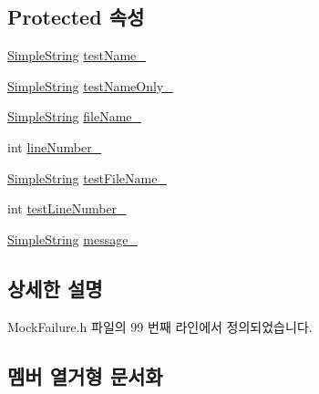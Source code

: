 \subsection*{Protected 속성}
\begin{DoxyCompactItemize}
\item 
\hyperlink{class_simple_string}{Simple\+String} \hyperlink{class_test_failure_afb42d7601608c3597c5279ddaf87e9d6}{test\+Name\+\_\+}
\item 
\hyperlink{class_simple_string}{Simple\+String} \hyperlink{class_test_failure_a60a0b2466b44483497e83d73b70241f2}{test\+Name\+Only\+\_\+}
\item 
\hyperlink{class_simple_string}{Simple\+String} \hyperlink{class_test_failure_a58b6159b0aa3b9775be67920baef742c}{file\+Name\+\_\+}
\item 
int \hyperlink{class_test_failure_ab83f5a7389dae9b8045aa6fbf55b153a}{line\+Number\+\_\+}
\item 
\hyperlink{class_simple_string}{Simple\+String} \hyperlink{class_test_failure_a19c231b59846532ec9d7ac8725886d67}{test\+File\+Name\+\_\+}
\item 
int \hyperlink{class_test_failure_abb1f7af8e12fc84b16898aa5b410ba2a}{test\+Line\+Number\+\_\+}
\item 
\hyperlink{class_simple_string}{Simple\+String} \hyperlink{class_test_failure_af95aeab689fdb637c3e94b0c10db3e53}{message\+\_\+}
\end{DoxyCompactItemize}


\subsection{상세한 설명}


Mock\+Failure.\+h 파일의 99 번째 라인에서 정의되었습니다.



\subsection{멤버 열거형 문서화}
